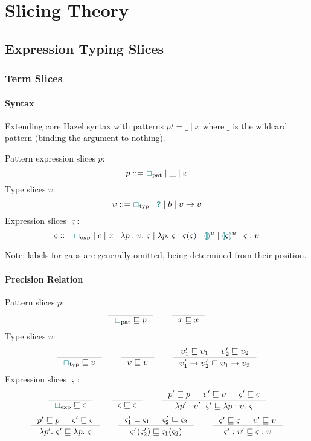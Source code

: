 \chapter{Slicing Theory}
\section{Expression Typing Slices}
\subsection{Term Slices}
\subsubsection{Syntax}
Extending core Hazel syntax with patterns $pt = \_ \mid x$ where $\_$ is the wildcard pattern (binding the argument to nothing).

\begin{definition}
\label{def:ExpressionSliceSyntaxAppendix}
Pattern expression slices $p$:
\[p ::= \gap_{\text{pat}} \mid \_ \mid x\]
Type slices $\upsilon$:
\[\upsilon ::= \gap_{\text{typ}} \mid \dyn \mid b \mid \upsilon \to \upsilon\]
Expression slices $\varsigma$:
\[\varsigma ::= \gap_{\text{exp}} \mid  c \mid x \mid \lambda p : \upsilon.\ \varsigma \mid \lambda p.\ \varsigma \mid \varsigma(\varsigma) \mid \hole^u \mid \hole[\varsigma]^u \mid \varsigma : \upsilon\]
\end{definition}
Note: labels for gaps are generally omitted, being determined from their position.
\subsubsection{Precision Relation}
\begin{definition}
Pattern slices $p$:
\[\inference{}{\gap_{\text{pat}} \sqsubseteq p} \qquad \inference{}{x \sqsubseteq x}\]
Type slices $\upsilon$:
\[\inference{}{\gap_{\text{typ}} \sqsubseteq \upsilon} \qquad \inference{}{\upsilon \sqsubseteq \upsilon} \qquad \inference{\upsilon_1' \sqsubseteq \upsilon_1 & \upsilon_2' \sqsubseteq \upsilon_2}{\upsilon_1' \to \upsilon_2' \sqsubseteq \upsilon_1 \to \upsilon_2}\]
Expression slices $\varsigma$:
\[\inference{}{\gap_{\text{exp}} \sqsubseteq \varsigma} \qquad \inference{}{\varsigma \sqsubseteq \varsigma} \qquad \inference{p' \sqsubseteq p & \upsilon' \sqsubseteq \upsilon & \varsigma' \sqsubseteq \varsigma}{\lambda p' : \upsilon'.\ \varsigma' \sqsubseteq \lambda p : \upsilon.\ \varsigma}\]
\[\inference{p' \sqsubseteq p & \varsigma' \sqsubseteq \varsigma}{\lambda p'.\ \varsigma' \sqsubseteq \lambda p.\ \varsigma} \qquad \inference{\varsigma_1' \sqsubseteq \varsigma_1 & \varsigma_2' \sqsubseteq \varsigma_2}{\varsigma_1'(\varsigma_2') \sqsubseteq \varsigma_1(\varsigma_2)} \qquad \inference{\varsigma' \sqsubseteq \varsigma & \upsilon' \sqsubseteq \upsilon}{\varsigma' : \upsilon' \sqsubseteq \varsigma : \upsilon}\]
\end{definition}


